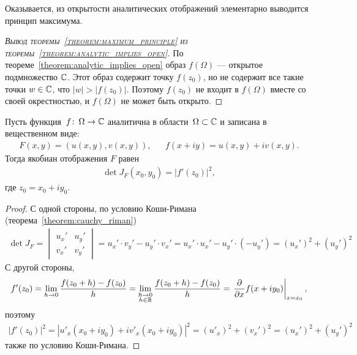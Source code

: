 \documentclass[../complex-analysis.tex]{subfiles}
\begin{document}
Оказывается, из открытости аналитических отображений элементарно выводится принцип максимума.

\begin{proof}[\normalfont\textsc{Вывод теоремы~\ref{theorem:maximum_principle} из теоремы~\ref{theorem:analytic_implies_open}}]
 По теореме~\ref{theorem:analytic_implies_open} образ $ f(\Omega) $ --- открытое подмножество $ \mathbb{C} $. Этот образ содержит точку $ f(z_0) $, но не содержит все такие точки $ w \in \mathbb{C} $, что $ \left| w \right| > \left| f(z_0) \right| $. Поэтому $ f(z_0) $ не входит в $ f(\Omega) $ вместе со своей окрестностью, и $ f(\Omega) $ не может быть открыто.
\end{proof}

\begin{lm}
 Пусть функция~$ f\colon\,\Omega\to\mathbb{C} $ аналитична в области~$ \Omega \subset \mathbb{C} $ и записана в вещественном виде:
 \begin{align*}
  F(x,y) = (u(x,y), v(x,y)), && f(x + iy) = u(x,y) + iv(x,y).
 \end{align*} Тогда якобиан отображения $ F $ равен
 \begin{align*}
  \det J_F (x_0,y_0) = \left| f'(z_0) \right|^{2},
 \end{align*} где $ z_0 = x_0 + iy_0 $.
\end{lm}
\begin{proof}
 С одной стороны, по условию Коши-Римана (теорема~\ref{theorem:cauchy_riman})
 \begin{align*}
  \det J_F = \begin{vmatrix}
   u_x' & u_y' \\
   v_x' & v_y'
  \end{vmatrix} = u_x' \cdot v_y' - u_y' \cdot v_x' = u_x' \cdot u_x' - u_y' \cdot (-u_y') = \left( u_x' \right)^{2} + \left( u_y' \right)^{2}
 \end{align*} С другой стороны,
 \begin{align*}
  f'(z_0) = \lim_{h \to 0}  \frac{f(z_0+h)-f(z_0)}{h} = \lim_{\substack{h \to 0 \\ h \in \mathbb{R}}} \frac{f(z_0+h) - f(z_0)}{h} = \left.\frac{\partial}{\partial x}f(x + iy_0)\right|_{x = x_0},
  \end{align*} поэтому
  \begin{align*}
   \left| f'(z_0) \right|^{2} = \left| u'_x(x_0 + iy_0) + iv'_x(x_0 + iy_0) \right|^2 =  \left( u'_x \right)^{2} + \left( v_x' \right)^{2} = \left( u_x' \right)^{2} + \left( u_y' \right)^{2}
  \end{align*} также по условию Коши-Римана.
 \end{proof}
\end{document}
